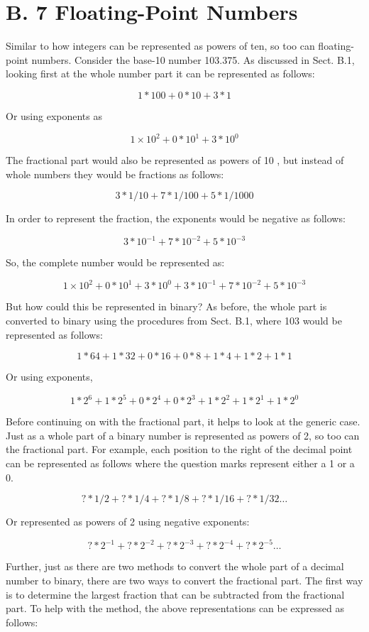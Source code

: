 \documentclass[10pt]{article}
\begin{document}
\section*{B. 7 Floating-Point Numbers}
Similar to how integers can be represented as powers of ten, so too can floating-point numbers. Consider the base-10 number 103.375. As discussed in Sect. B.1, looking first at the whole number part it can be represented as follows:

$$
1 * 100+0 * 10+3 * 1
$$

Or using exponents as

$$
1 \times 10^{2}+0 * 10^{1}+3 * 10^{0}
$$

The fractional part would also be represented as powers of 10 , but instead of whole numbers they would be fractions as follows:

$$
3 * 1 / 10+7 * 1 / 100+5 * 1 / 1000
$$

In order to represent the fraction, the exponents would be negative as follows:

$$
3 * 10^{-1}+7 * 10^{-2}+5 * 10^{-3}
$$

So, the complete number would be represented as:

$$
1 \times 10^{2}+0 * 10^{1}+3 * 10^{0}+3 * 10^{-1}+7 * 10^{-2}+5 * 10^{-3}
$$

But how could this be represented in binary? As before, the whole part is converted to binary using the procedures from Sect. B.1, where 103 would be represented as follows:

$$
1 * 64+1 * 32+0 * 16+0 * 8+1 * 4+1 * 2+1 * 1
$$

Or using exponents,

$$
1 * 2^{6}+1 * 2^{5}+0 * 2^{4}+0 * 2^{3}+1 * 2^{2}+1 * 2^{1}+1 * 2^{0}
$$

Before continuing on with the fractional part, it helps to look at the generic case. Just as a whole part of a binary number is represented as powers of 2, so too can the fractional part. For example, each position to the right of the decimal point can be represented as follows where the question marks represent either a 1 or a 0.

$$
? * 1 / 2+? * 1 / 4+? * 1 / 8+? * 1 / 16+? * 1 / 32 \ldots
$$

Or represented as powers of 2 using negative exponents:

$$
? * 2^{-1}+? * 2^{-2}+? * 2^{-3}+? * 2^{-4}+? * 2^{-5} \ldots
$$

Further, just as there are two methods to convert the whole part of a decimal number to binary, there are two ways to convert the fractional part. The first way is to determine the largest fraction that can be subtracted from the fractional part. To help with the method, the above representations can be expressed as follows:
\end{document}
